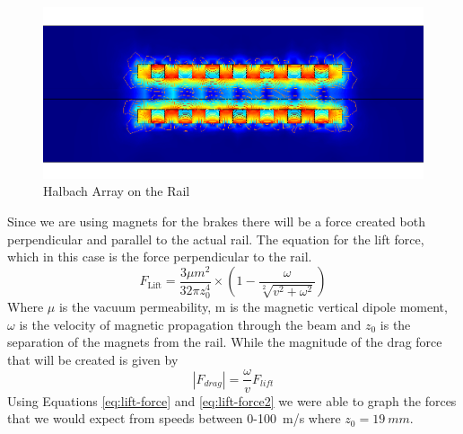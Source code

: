 \documentclass[main.tex]{subfiles}
\begin{document}
    \begin{figure}
        \centering
        \includegraphics[width=\linewidth]{images/halbach_array.png}
        \caption{Halbach Array on the Rail}
        \label{fig:halbach-array}
    \end{figure}
     Since we are using magnets for the brakes there will be a force created both perpendicular and parallel to the actual rail. The equation for the lift force, which in this case is the force perpendicular to the rail.
     \begin{equation}\label{eq:lift-force}
     F_{\textrm{Lift}} = \frac{3\mu m^2}{32\pi z_0^4}\times\left(1 -\frac{\omega}{\sqrt[2]{v^2+\omega^2}}\right)
    \end{equation}
    Where $\mu$ is the vacuum permeability, m is the magnetic vertical dipole moment, $\omega$ is the velocity of magnetic propagation through the beam and $z_0$ is the separation of the magnets from the rail. While the magnitude of the drag force that will be created is given by
    \begin{equation}\label{eq:lift-force2}
    \left\lvert F_{drag}\right\rvert = \frac{\omega}{v} F_{lift}
    \end{equation}
     Using Equations \ref{eq:lift-force} and \ref{eq:lift-force2} we were able to graph the forces that we would expect from speeds between 0-\SI{100}{m/s} where $z_0 = \SI{19}{mm}$.\\
\end{document}
